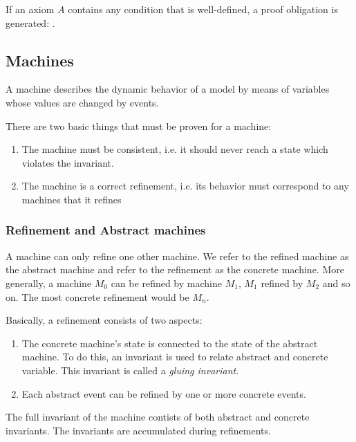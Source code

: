 If an axiom $A$ contains any condition that is well-defined, a proof obligation is generated:
.


\subsection{Machines}
\label{machine}
A machine describes the dynamic behavior of a model by means of variables whose values are changed by events.

There are two basic things that must be proven for a machine:
\begin{enumerate}
	\item The machine must be consistent, i.e. it should never reach a state which violates the invariant.
	\item The machine is a correct refinement, i.e. its behavior must correspond to any machines that it refines
\end{enumerate}

\subsubsection{Refinement and Abstract machines}
\label{abstract_machine}
A machine can only refine one other machine. 
We refer to the refined machine as the abstract machine and refer to the refinement as the concrete machine. 
More generally, a machine $M_0$ can be refined by machine $M_1$, $M_1$ refined by $M_2$ 
and so on. The most concrete refinement would be $M_n$. 

Basically, a refinement consists of two aspects:
\begin{enumerate}
	\item The concrete machine's state is connected to the state of the
      abstract machine. To do this, an invariant is used to relate abstract and concrete variable. 
      This invariant is called a \emph{gluing invariant}. 
	\item Each abstract event can be refined by one or more
concrete events.
\end{enumerate}

The full invariant of the machine contists of both abstract and concrete invariants. 
The invariants are accumulated during refinements.

